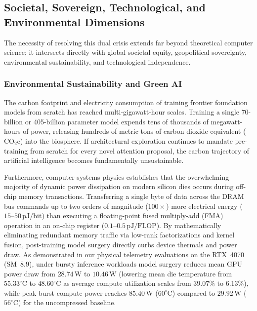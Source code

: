\subsection{Societal, Sovereign, Technological, and Environmental Dimensions}
\label{subsec:dimensions}

The necessity of resolving this dual crisis extends far beyond theoretical computer science; it intersects directly with global societal equity, geopolitical sovereignty, environmental sustainability, and technological independence.

\subsubsection{Environmental Sustainability and Green AI}
\label{subsubsec:environmental_green_ai}

The carbon footprint and electricity consumption of training frontier foundation models from scratch has reached multi-gigawatt-hour scales.
Training a single 70-billion or 405-billion parameter model expends tens of thousands of megawatt-hours of power, releasing hundreds of metric tons of carbon dioxide equivalent ($\text{CO}_2\text{e}$) into the biosphere.
If architectural exploration continues to mandate pre-training from scratch for every novel attention proposal, the carbon trajectory of artificial intelligence becomes fundamentally unsustainable.

Furthermore, computer systems physics establishes that the overwhelming majority of dynamic power dissipation on modern silicon dies occurs during off-chip memory transactions.
Transferring a single byte of data across the DRAM bus commands up to two orders of magnitude ($100\times$) more electrical energy ($15\text{--}50\,\text{pJ/bit}$) than executing a floating-point fused multiply-add (FMA) operation in an on-chip register ($0.1\text{--}0.5\,\text{pJ/FLOP}$).
By mathematically eliminating redundant memory traffic via low-rank factorizations and kernel fusion, post-training model surgery directly curbs device thermals and power draw.
As demonstrated in our physical telemetry evaluations on the RTX~4070 (SM~8.9), under bursty inference workloads model surgery reduces mean GPU power draw from $28.74\,\text{W}$ to $10.46\,\text{W}$ (lowering mean die temperature from $55.33^\circ\text{C}$ to $48.60^\circ\text{C}$ as average compute utilization scales from $39.07\%$ to $6.13\%$), while peak burst compute power reaches $85.40\,\text{W}$ ($60^\circ\text{C}$) compared to $29.92\,\text{W}$ ($56^\circ\text{C}$) for the uncompressed baseline.

